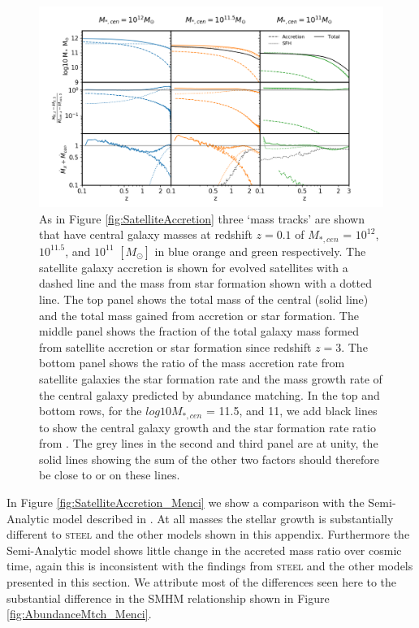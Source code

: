 \begin{figure}
	\centering
	\includegraphics[width = \linewidth]{Appendices/StellarMassAssembly/SatelliteAccretion_UniM.png}
    \caption{As in Figure \ref{fig:SatelliteAccretion} three `mass tracks' are shown that have central galaxy masses at redshift $z = 0.1$ of $M_{*,cen}$ = $10^{12}$, $10^{11.5}$, and $10^{11}$ $[M_{\odot}]$ in blue orange and green respectively. The satellite galaxy accretion is shown for evolved satellites with a dashed line and the mass from star formation shown with a dotted line. The top panel shows the total mass of the central (solid line) and the total mass gained from accretion or star formation. The middle panel shows the fraction of the total galaxy mass formed from satellite accretion or star formation since redshift $z=3$. The bottom panel shows the ratio of the mass accretion rate from satellite galaxies the star formation rate and the mass growth rate of the central galaxy predicted by abundance matching. In the top and bottom rows, for the $log 10 M_{*,cen}$ = 11.5, and 11, we add black lines to show the central galaxy growth and the star formation rate ratio from \citet{Behroozi2019UniverseMachine:010}. The grey lines in the second and third panel are at unity, the solid lines showing the sum of the other two factors should therefore be close to or on these lines.}
	\label{fig:SatelliteAccretion_UniM}
\end{figure}

In Figure \ref{fig:SatelliteAccretion_Menci} we show a comparison with the Semi-Analytic model described in \citet{Menci2014TriggeringInteractions}. At all masses the stellar growth is substantially different to \textsc{steel} and the other models shown in this appendix. Furthermore the Semi-Analytic model shows little change in the accreted mass ratio over cosmic time, again this is inconsistent with the findings from \textsc{steel} and the other models presented in this section. We attribute most of the differences seen here to the substantial difference in the SMHM relationship shown in Figure \ref{fig:AbundanceMtch_Menci}.

